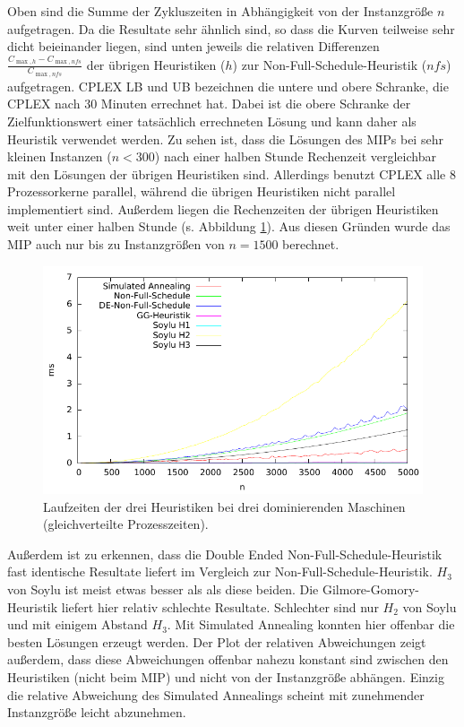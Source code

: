 \documentclass{scrreprt}
\begin{document}
Oben sind die Summe der Zykluszeiten in Abhängigkeit von der Instanzgröße $n$ aufgetragen.
Da die Resultate sehr ähnlich sind, so dass die Kurven teilweise sehr dicht beieinander liegen, 
sind unten jeweils die relativen Differenzen $\frac{C_{\max,h}-C_{\max,nfs}}{C_{\max,nfs}}$ der übrigen Heuristiken ($h$) zur Non-Full-Schedule-Heuristik ($nfs$) aufgetragen.
CPLEX LB und UB bezeichnen die untere und obere Schranke, die CPLEX nach 30 Minuten errechnet hat.
Dabei ist die obere Schranke der Zielfunktionswert einer tatsächlich errechneten Lösung und kann daher als Heuristik verwendet werden.
Zu sehen ist, dass die Lösungen des MIPs bei sehr kleinen Instanzen ($n<300$) nach einer halben Stunde Rechenzeit vergleichbar mit den Lösungen der übrigen Heuristiken sind.
Allerdings benutzt CPLEX alle 8 Prozessorkerne parallel, während die übrigen Heuristiken nicht parallel implementiert sind.
Außerdem liegen die Rechenzeiten der übrigen Heuristiken weit unter einer halben Stunde (s. Abbildung \ref{abb:3domtime}).
Aus diesen Gründen wurde das MIP auch nur bis zu Instanzgrößen von $n=1500$ berechnet.
\begin{figure}
    \begin{center}
        \includegraphics[width=.8\textwidth]{../instances/3dom/plottime.pdf}
    \end{center}
    \caption{
        \label{abb:3domtime}
        Laufzeiten der drei Heuristiken bei drei dominierenden Maschinen (gleichverteilte Prozesszeiten).
    }
\end{figure}

Außerdem ist zu erkennen, dass die Double Ended Non-Full-Schedule-Heuristik fast identische Resultate liefert im Vergleich zur Non-Full-Schedule-Heuristik.
$H_3$ von Soylu ist meist etwas besser als als diese beiden.
Die Gilmore-Gomory-Heuristik liefert hier relativ schlechte Resultate.
Schlechter sind nur $H_2$ von Soylu und mit einigem Abstand $H_3$.
Mit Simulated Annealing konnten hier offenbar die besten Lösungen erzeugt werden.
Der Plot der relativen Abweichungen zeigt außerdem, dass diese Abweichungen offenbar nahezu konstant sind zwischen den Heuristiken (nicht beim MIP) 
und nicht von der Instanzgröße abhängen.
Einzig die relative Abweichung des Simulated Annealings scheint mit zunehmender Instanzgröße leicht abzunehmen.
\end{document}
